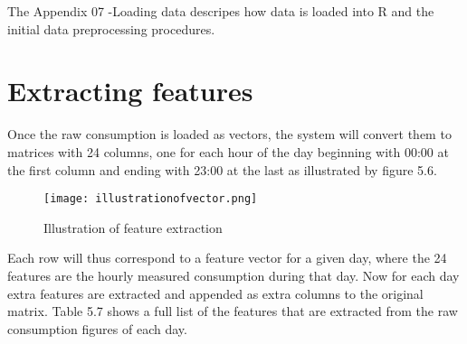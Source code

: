 The Appendix 07 -Loading data descripes how data is loaded into R and the initial data preprocessing procedures.

\section*{Extracting features}
Once the raw consumption is loaded as vectors, the system will convert them to matrices with 24 columns, one for each hour of the day beginning with 00:00 at the first column and ending with 23:00 at the last as illustrated by figure 5.6. 
\begin{figure}
\texttt{[image: illustrationofvector.png]}
\caption{Illustration of feature extraction}
\end{figure}

Each row will thus correspond to a feature vector for a given day, where the 24 features are the hourly measured consumption during that day. Now for each day extra features are extracted and appended as extra columns to the original matrix. Table 5.7 shows a full list of the features that are extracted from the raw consumption figures of each day. 
